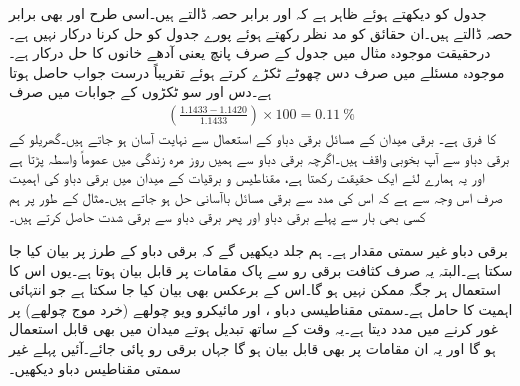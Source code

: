 جدول کو دیکھتے ہوئے ظاہر ہے کہ  اور  برابر حصہ ڈالتے ہیں۔اسی طرح  اور  بھی برابر حصہ ڈالتے ہیں۔ان حقائق کو مد نظر رکھتے ہوئے پورے جدول کو حل کرنا درکار نہیں ہے۔درحقیقت موجودہ مثال میں جدول کے صرف پانچ یعنی آدھے خانوں  کا حل درکار ہے۔موجودہ مسئلے میں صرف دس چھوٹے ٹکڑے کرتے ہوئے تقریباً درست جواب حاصل ہوتا ہے۔دس اور سو ٹکڑوں کے جوابات میں صرف
\begin{align*}
\left(\frac{1.1433-1.1420}{1.1433}\right)\times 100=\SI{0.11}{\percent} 
\end{align*}
کا فرق ہے۔
برقی میدان کے مسائل برقی دباو کے استعمال سے نہایت آسان ہو جاتے ہیں۔گھریلو  کے برقی دباو سے آپ بخوبی واقف ہیں۔اگرچہ برقی دباو سے ہمیں روز مرہ زندگی میں عموماً واسطہ پڑتا ہے اور یہ ہمارے لئے ایک حقیقت رکھتا ہے، مقناطیس و برقیات کے میدان میں برقی دباو کی اہمیت صرف اس وجہ سے ہے کہ اس کی مدد سے برقی مسائل باآسانی حل ہو جاتے ہیں۔مثال کے طور پر ہم کسی بھی بار سے پہلے برقی دباو اور پھر برقی دباو سے برقی شدت حاصل کرتے ہیں۔

برقی دباو غیر سمتی مقدار ہے۔ ہم جلد دیکھیں گے کہ برقی دباو کے طرز پر  بیان کیا جا سکتا ہے۔البتہ یہ صرف کثافت برقی رو سے پاک مقامات پر قابل بیان ہوتا ہے۔یوں اس کا استعمال ہر جگہ ممکن نہیں ہو گا۔اس کے برعکس  بھی بیان کیا جا سکتا ہے جو انتہائی اہمیت کا حامل ہے۔سمتی مقناطیسی دباو ،  اور مائیکرو ویو چولھے (خرد موج چولھے) پر غور کرنے میں مدد دیتا ہے۔یہ وقت کے ساتھ تبدیل ہوتے میدان میں بھی قابل استعمال ہو گا اور یہ ان مقامات پر بھی قابل بیان ہو گا جہاں برقی رو پائی جائے۔آئیں پہلے غیر سمتی مقناطیس دباو دیکھیں۔

